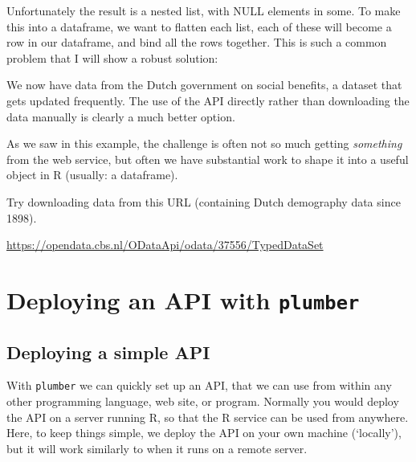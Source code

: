 \documentclass[]{book}
\newenvironment{Shaded}{\begin{snugshade}}{\end{snugshade}}
\newcommand{\CommentTok}[1]{\textcolor[rgb]{0.56,0.35,0.01}{\textit{#1}}}
\newcommand{\KeywordTok}[1]{\textcolor[rgb]{0.13,0.29,0.53}{\textbf{#1}}}
\newcommand{\NormalTok}[1]{#1}
\newcommand{\OperatorTok}[1]{\textcolor[rgb]{0.81,0.36,0.00}{\textbf{#1}}}
\newcommand{\StringTok}[1]{\textcolor[rgb]{0.31,0.60,0.02}{#1}}
\let\BeginKnitrBlock\begin \let\EndKnitrBlock\end
\begin{document}
Unfortunately the result is a nested list, with NULL elements in some. To make this into a dataframe, we want to flatten each list, each of these will become a row in our dataframe, and bind all the rows together. This is such a common problem that I will show a robust solution:

\begin{Shaded}
\end{Shaded}

We now have data from the Dutch government on social benefits, a dataset that gets updated frequently. The use of the API directly rather than downloading the data manually is clearly a much better option.

As we saw in this example, the challenge is often not so much getting \emph{something} from the web service, but often we have substantial work to shape it into a useful object in R (usually: a dataframe).

\BeginKnitrBlock{rmdtry}
Try downloading data from this URL (containing Dutch demography data since 1898).

\url{https://opendata.cbs.nl/ODataApi/odata/37556/TypedDataSet}
\EndKnitrBlock{rmdtry}

\hypertarget{deploying-an-api-with-plumber}{%
\section{\texorpdfstring{Deploying an API with \texttt{plumber}}{Deploying an API with plumber}}\label{deploying-an-api-with-plumber}}

\hypertarget{deploying-a-simple-api}{%
\subsection{Deploying a simple API}\label{deploying-a-simple-api}}

With \texttt{plumber} we can quickly set up an API, that we can use from within any other programming language, web site, or program. Normally you would deploy the API on a server running R, so that the R service can be used from anywhere. Here, to keep things simple, we deploy the API on your own machine (`locally'), but it will work similarly to when it runs on a remote server.
\end{document}
